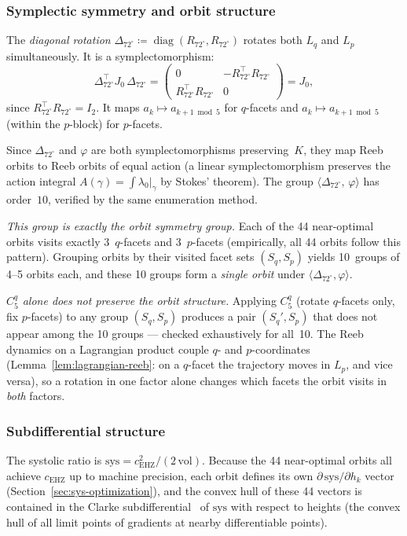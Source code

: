 \subsubsection*{Symplectic symmetry and orbit structure}

The \emph{diagonal rotation}
$\Delta_{72^\circ} \coloneqq \operatorname{diag}(R_{72^\circ}, R_{72^\circ})$
rotates both $L_q$ and $L_p$ simultaneously.
It is a symplectomorphism:
\[
  \Delta_{72^\circ}^\top J_0\, \Delta_{72^\circ}
  = \begin{pmatrix} 0 & -R_{72^\circ}^\top R_{72^\circ} \\
    R_{72^\circ}^\top R_{72^\circ} & 0 \end{pmatrix}
  = J_0,
\]
since $R_{72^\circ}^\top R_{72^\circ} = I_2$.
It maps $a_k \mapsto a_{k+1\bmod 5}$ for $q$-facets and
$a_k \mapsto a_{k+1\bmod 5}$ (within the $p$-block) for $p$-facets.

Since $\Delta_{72^\circ}$ and $\varphi$ are both symplectomorphisms
preserving~$K$,
they map Reeb orbits to Reeb orbits of equal action
(a linear symplectomorphism preserves the action integral
$A(\gamma) = \int \lambda_0|_\gamma$ by Stokes' theorem).
The group $\langle \Delta_{72^\circ},\, \varphi \rangle$ has order~$10$,
verified by the same enumeration method.

\emph{This group is exactly the orbit symmetry group.}
Each of the 44 near-optimal orbits visits exactly
3~$q$-facets and 3~$p$-facets (empirically, all 44 orbits follow this
pattern).
Grouping orbits by their visited facet sets $(S_q, S_p)$ yields
10~groups of 4--5 orbits each, and these 10 groups form a
\emph{single orbit} under $\langle \Delta_{72^\circ}, \varphi \rangle$.

\emph{$C_5^q$ alone does not preserve the orbit structure.}
Applying $C_5^q$ (rotate $q$-facets only, fix $p$-facets) to any
group $(S_q, S_p)$ produces a pair $(S_q', S_p)$ that does not
appear among the 10 groups ---
checked exhaustively for all~10.
The Reeb dynamics on a Lagrangian product couple $q$- and
$p$-coordinates (Lemma~\ref{lem:lagrangian-reeb}: on a $q$-facet
the trajectory moves in $L_p$, and vice versa), so a rotation
in one factor alone changes which facets the orbit visits in
\emph{both} factors.

\subsubsection*{Subdifferential structure}

The systolic ratio is $\mathrm{sys} = c_{\mathrm{EHZ}}^2 / (2\,\mathrm{vol})$.
Because the 44 near-optimal orbits all achieve $c_{\mathrm{EHZ}}$ up to
machine precision, each orbit defines its own
$\partial\,\mathrm{sys}/\partial h_k$ vector
(Section~\ref{sec:sys-optimization}),
and the convex hull of these 44 vectors is contained in the Clarke
subdifferential~\cite{Clarke1983} of $\mathrm{sys}$ with respect to
heights (the convex hull of all limit points of gradients at nearby
differentiable points).

